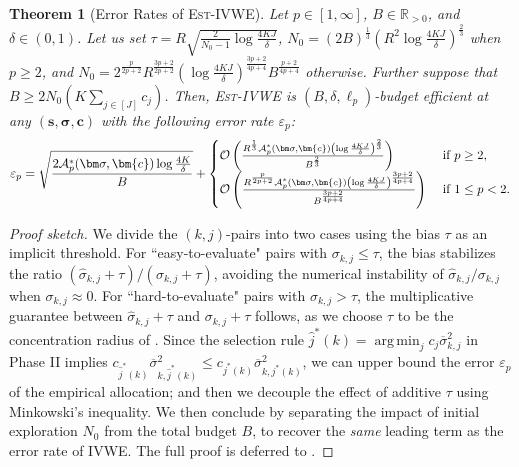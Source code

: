 \documentclass{article}
\def\vc{{\bm{c}}}
\def\vs{{\bm{s}}}
\def\gA{{\mathcal{A}}}
\def\gO{{\mathcal{O}}}
\def\sR{{\mathbb{R}}}
\DeclareMathOperator*{\argmin}{arg\,min}
\theoremstyle{plain}
\newtheorem{theorem}{Theorem}[section]
\theoremstyle{definition}
\theoremstyle{plain}
\newcommand{\estivwe}{\textsc{Est-IVWE}}
\newcommand{\ivwe}{\textsc{IVWE}}
\begin{document}
\begin{theorem}[Error Rates of \estivwe{}]
\label{thm:est-ivwe}
    Let $p \in [1, \infty]$, $B \in \sR_{> 0}$, and $\delta \in (0, 1)$.
    Let us set $\tau = R \sqrt{\frac{2}{N_0 - 1} \log\frac{4 K J}{\delta}}$, $N_0 = (2 B)^{\frac{1}{3}} \left( R^2 \log\frac{4 K J}{\delta} \right)^{\frac{2}{3}}$ when $p \geq 2$, and $N_0 = 2^{\frac{p}{2p+2}} R^{\frac{3p+2}{2p+2}} \left( \log\frac{4KJ}{\delta} \right)^{\frac{3p+2}{4p+4}} B^{\frac{p+2}{4p+4}}$ otherwise.
    Further suppose that $B \geq 2 N_0 \left( K \sum_{j\in[J]} c_j \right)$.
    Then, \estivwe{} is $(B, \delta, \ell_p)$-budget efficient at any $(\vs, \bm\sigma, \vc)$ with the following error rate $\varepsilon_p$:
    \begin{equation}
            \varepsilon_p = \sqrt{\frac{2 \gA_p^*(\bm\sigma, \vc) \log\frac{4K}{\delta}}{B}} +
            \begin{cases}
                \gO\left( \frac{R^{\frac{1}{3}} \gA_p^*(\bm\sigma, \vc) \left( \log\frac{4KJ}{\delta} \right)^{\frac{2}{3}}}{B^{\frac{2}{3}}} \right) & \hbox{ if }p \geq 2, \\
                \gO\left( \frac{R^{\frac{p}{2p+2}} \gA_p^*(\bm\sigma, \vc) \left( \log\frac{4KJ}{\delta} \right)^{\frac{3p+2}{4p+4}}}{B^{\frac{3p+2}{4p+4}}} \right) & \hbox{ if } 1 \leq p < 2.
            \end{cases}
        \end{equation}
\end{theorem}
\begin{proof}[Proof sketch]
    We divide the $(k,j)$-pairs into two cases using the bias $\tau$ as an implicit threshold.
    For ``easy-to-evaluate" pairs with $\sigma_{k,j} \leq \tau$, the bias stabilizes the ratio $(\hat{\sigma}_{k,j}+\tau)/(\sigma_{k,j}+\tau)$, avoiding the numerical instability of $\hat{\sigma}_{k,j}/ \sigma_{k,j}$ when $\sigma_{k,j} \approx 0$.
    For ``hard-to-evaluate" pairs with $\sigma_{k,j} > \tau$, the multiplicative guarantee between $\hat{\sigma}_{k,j}+\tau$ and $\sigma_{k,j}+\tau$ follows, as we choose $\tau$ to be the concentration radius of \citep[Theorem 10]{maurer-pontil}.
    Since the selection rule $\hat{j}^*(k)=\argmin_{j} c_j \overline{\sigma}_{k,j}^2$ in Phase II implies $c_{\hat{j}^*(k)} \overline{\sigma}_{k,\hat{j}^*(k)}^2 \leq c_{j^*(k)}\overline{\sigma}_{k,j^*(k)}^2$, we can upper bound the error $\varepsilon_p$ of the empirical allocation; and then we decouple the effect of additive $\tau$ using Minkowski's inequality.
    We then conclude by separating the impact of initial exploration $N_0$ from the total budget $B$, to recover the \emph{same} leading term as the error rate of \ivwe{}.
    The full proof is deferred to .
\end{proof}
\end{document}
